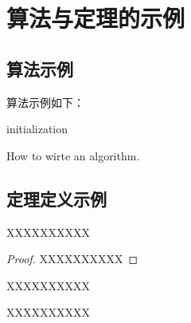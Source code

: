 
\chapter{算法与定理的示例}\label{ch:5}

\section{算法示例}

\noindent 算法示例如下：

\begin{algorithm}[H]
    initialization\;
    \caption{How to wirte an algorithm.}
\end{algorithm}



\section{定理定义示例}

\begin{theorem}
    XXXXXXXXXX
\end{theorem}
\begin{proof}
    XXXXXXXXXX
\end{proof}
\begin{corollary}
    XXXXXXXXXX
\end{corollary}
\begin{lemma}
    XXXXXXXXXX
\end{lemma}